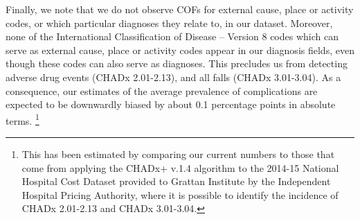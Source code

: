 \documentclass[submission]{grattan}
\begin{document}
Finally, we note that we do not observe COFs for external cause, place or activity codes, or which particular diagnoses they relate to, in our dataset.
Moreover, none of the International Classification of Disease -- Version 8 codes which can serve as external cause, place or activity codes appear in our diagnosis fields, even though these codes can also serve as diagnoses.
This precludes us from detecting adverse drug events (CHADx 2.01-2.13), and all falls (CHADx 3.01-3.04).
As a consequence, our estimates of the average prevalence of complications are expected to be downwardly biased by about 0.1 percentage points in absolute terms.%
	\footnote{This has been estimated by comparing our current numbers to those that come from applying the CHADx+ v.1.4 algorithm to the 2014-15 National Hospital Cost Dataset provided to Grattan Institute by the Independent Hospital Pricing Authority, where it is possible to identify the incidence of CHADx 2.01-2.13 and CHADx 3.01-3.04.}
\end{document}
